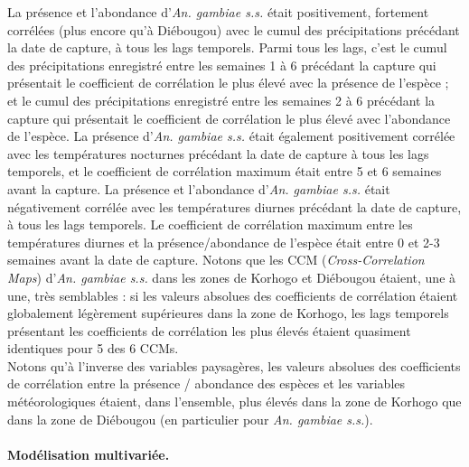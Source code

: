 \documentclass[12pt,twoside]{reedthesis}
\begin{document}
La présence et l'abondance d'\emph{An. gambiae s.s.} était positivement, fortement corrélées (plus encore qu'à Diébougou) avec le cumul des précipitations précédant la date de capture, à tous les lags temporels. Parmi tous les lags, c'est le cumul des précipitations enregistré entre les semaines 1 à 6 précédant la capture qui présentait le coefficient de corrélation le plus élevé avec la présence de l'espèce ; et le cumul des précipitations enregistré entre les semaines 2 à 6 précédant la capture qui présentait le coefficient de corrélation le plus élevé avec l'abondance de l'espèce. La présence d'\emph{An. gambiae s.s.} était également positivement corrélée avec les températures nocturnes précédant la date de capture à tous les lags temporels, et le coefficient de corrélation maximum était entre 5 et 6 semaines avant la capture. La présence et l'abondance d'\emph{An. gambiae s.s.} était négativement corrélée avec les températures diurnes précédant la date de capture, à tous les lags temporels. Le coefficient de corrélation maximum entre les températures diurnes et la présence/abondance de l'espèce était entre 0 et 2-3 semaines avant la date de capture. Notons que les CCM (\emph{Cross-Correlation Maps}) d'\emph{An. gambiae s.s.} dans les zones de Korhogo et Diébougou étaient, une à une, très semblables : si les valeurs absolues des coefficients de corrélation étaient globalement légèrement supérieures dans la zone de Korhogo, les lags temporels présentant les coefficients de corrélation les plus élevés étaient quasiment identiques pour 5 des 6 CCMs.\\

Notons qu'à l'inverse des variables paysagères, les valeurs absolues des coefficients de corrélation entre la présence / abondance des espèces et les variables météorologiques étaient, dans l'ensemble, plus élevés dans la zone de Korhogo que dans la zone de Diébougou (en particulier pour \emph{An. gambiae s.s.}).

\hypertarget{moduxe9lisation-multivariuxe9e.}{%
\paragraph{Modélisation multivariée.}\label{moduxe9lisation-multivariuxe9e.}}
\end{document}
